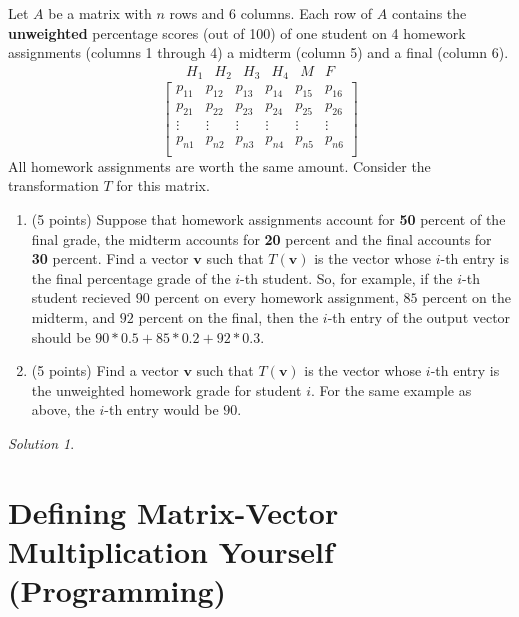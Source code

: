 \documentclass{article}
\theoremstyle{remark}
\newtheorem*{solution}{Solution}
\begin{document}
Let $A$ be a matrix with $n$ rows and 6 columns.
Each row of $A$ contains the \textbf{unweighted} percentage scores (out of 100) of one student on 4 homework assignments (columns 1 through 4) a midterm (column 5) and a final (column 6).
\begin{displaymath}
  \begin{matrix}
    H_1 & H_2 & H_3 & H_4 & M & F
  \end{matrix}
\end{displaymath}
\begin{displaymath}
  \begin{bmatrix}
    p_{11} & p_{12} & p_{13} & p_{14} & p_{15} & p_{16} \\
    p_{21} & p_{22} & p_{23} & p_{24} & p_{25} & p_{26} \\
    \vdots & \vdots & \vdots & \vdots & \vdots & \vdots \\
    p_{n1} & p_{n2} & p_{n3} & p_{n4} & p_{n5} & p_{n6} \\
  \end{bmatrix}
\end{displaymath}
All homework assignments are worth the same amount.
Consider the transformation $T$ for this matrix.
\begin{enumerate}
\item (5 points)
  Suppose that homework assignments account for \textbf{50} percent of the final grade, the midterm accounts for \textbf{20} percent and the final accounts for \textbf{30} percent.
  Find a vector $\mathbf v$ such that $T(\mathbf v)$ is the vector whose $i$-th entry is the final percentage grade of the $i$-th student.
  So, for example, if the $i$-th student recieved $90$ percent on every homework assignment, $85$ percent on the midterm, and $92$ percent on the final, then the $i$-th entry of the output vector should be $90 * 0.5 + 85 * 0.2 + 92 * 0.3$.
\item (5 points)
  Find a vector $\mathbf v$ such that $T(\mathbf v)$ is the vector whose $i$-th entry is the unweighted homework grade for student $i$. For the same example as above, the $i$-th entry would be $90$.
\end{enumerate}
\medskip

\begin{solution}
\end{solution}

\pagebreak
\section{Defining Matrix-Vector Multiplication Yourself (Programming)}
\end{document}

